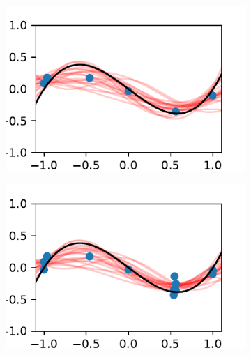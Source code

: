 \documentclass{beamer}
\begin{document}
\begin{frame}
\begin{figure}
\begin{subfigure}[t]{0.4\textwidth}
            \includegraphics[width=\textwidth]{UCB_6_iters.pdf}
        \end{subfigure}%
        \begin{subfigure}[t]{0.4\textwidth}
            \centering
            \includegraphics[width=\textwidth]{UCB_12_iters.pdf}
        \end{subfigure}%
    \end{figure}
\end{frame}
\end{document}
